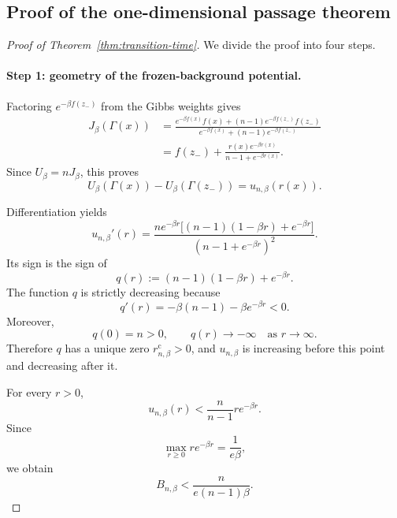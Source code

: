 \documentclass{article}
\theoremstyle{plain}
\theoremstyle{definition}
\theoremstyle{remark}
\begin{document}
\subsection{Proof of the one-dimensional passage theorem}
\label{app:proof-one-dimensional-passage}

\begin{proof}[Proof of Theorem~\ref{thm:transition-time}]
We divide the proof into four steps.

\paragraph{Step 1: geometry of the frozen-background potential.}
Factoring \(e^{-\beta f(z_-)}\) from the Gibbs weights gives
\begin{align*}
    J_\beta(\Gamma(x))
    &=
    \frac{
        e^{-\beta f(x)}f(x)
        +(n-1)e^{-\beta f(z_-)}f(z_-)
    }{
        e^{-\beta f(x)}
        +(n-1)e^{-\beta f(z_-)}
    }
    \\
    &=
    f(z_-)
    +
    \frac{r(x)e^{-\beta r(x)}}{n-1+e^{-\beta r(x)}}.
\end{align*}
Since \(U_\beta=nJ_\beta\), this proves
\[
    U_\beta(\Gamma(x))-U_\beta(\Gamma(z_-))
    =
    u_{n,\beta}(r(x)).
\]

Differentiation yields
\begin{equation}
    u_{n,\beta}'(r)
    =
    \frac{
        ne^{-\beta r}
        \bigl[(n-1)(1-\beta r)+e^{-\beta r}\bigr]
    }{
        (n-1+e^{-\beta r})^2
    }.
    \label{eq:reduced-softmin-derivative}
\end{equation}
Its sign is the sign of
\[
    q(r):=(n-1)(1-\beta r)+e^{-\beta r}.
\]
The function \(q\) is strictly decreasing because
\[
    q'(r)
    =
    -\beta(n-1)-\beta e^{-\beta r}<0.
\]
Moreover,
\[
    q(0)=n>0,
    \qquad
    q(r)\longrightarrow-\infty
    \quad\text{as }r\to\infty.
\]
Therefore \(q\) has a unique zero
\(r_{n,\beta}^{\mathrm c}>0\), and \(u_{n,\beta}\) is increasing before this point and decreasing after it.

For every \(r>0\),
\[
    u_{n,\beta}(r)
    <
    \frac{n}{n-1}r e^{-\beta r}.
\]
Since
\[
    \max_{r\ge0}r e^{-\beta r}
    =
    \frac{1}{e\beta},
\]
we obtain
\[
    B_{n,\beta}
    <
    \frac{n}{e(n-1)\beta}.
\]


\end{proof}
\end{document}
